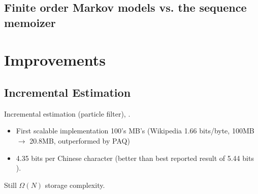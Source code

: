 \documentclass[16pt]{beamer}
\begin{document}
\subsection{Finite order Markov models vs. the sequence memoizer}



\section{Improvements}
\subsection{Incremental Estimation}
\begin{frame}[t]{}
Incremental estimation (particle filter), \citet{Gasthaus2010}.  
\begin{itemize}
\item First scalable implementation 100's MB's (Wikipedia 1.66 bits/byte, 100MB $\rightarrow$ 20.8MB, outperformed by PAQ)
\item 4.35 bits per Chinese character (better than best reported result of 5.44 bits \cite{Wu2007}).
\end{itemize}

\vspace{2cm}

Still $\Omega(N)$ storage complexity.


\end{frame}
\end{document}
